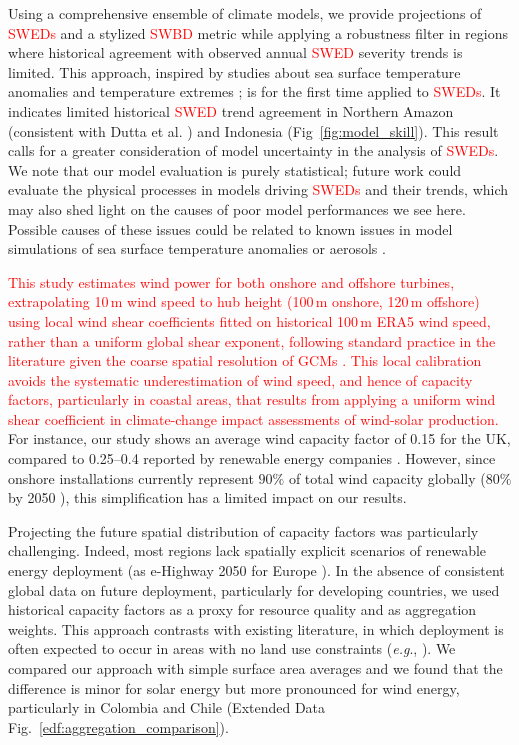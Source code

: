 \documentclass[pdflatex,sn-mathphys-num]{sn-jnl}%
\begin{document}
Using a comprehensive ensemble of climate models, we provide projections of \textcolor{red}{SWEDs} and a stylized \textcolor{red}{SWBD} metric while applying a robustness filter in regions where historical agreement with observed annual \textcolor{red}{SWED} severity trends is limited. This approach, inspired by studies about sea surface temperature anomalies \cite{ipcc2021physical} and temperature extremes \cite{kornhuberGlobalEmergenceRegional2024}; is for the first time applied to \textcolor{red}{SWEDs}. It indicates limited historical \textcolor{red}{SWED} trend agreement in Northern Amazon (consistent with Dutta et al. \cite{duttaFutureSolarEnergy2022}) and Indonesia (Fig~\ref{fig:model_skill}). This result calls for a greater consideration of model uncertainty in the analysis of \textcolor{red}{SWEDs}. We note that our model evaluation is purely statistical; future work could evaluate the physical processes in models driving \textcolor{red}{SWEDs} and their trends, which may also shed light on the causes of poor model performances we see here. Possible causes of these issues could be related to known issues in model simulations of sea surface temperature anomalies or aerosols \cite{schumacherExacerbatedSummerEuropean2024, bartokProjectedChangesSurface2017a}. 


\textcolor{red}{This study estimates wind power for both onshore and offshore turbines, extrapolating 10\,m wind speed to hub height (100\,m onshore, 120\,m offshore) using local wind shear coefficients fitted on historical 100\,m ERA5 wind speed, rather than a uniform global shear exponent, following standard practice in the literature given the coarse spatial resolution of GCMs \cite{quProlongedWindDroughts2025a}. This local calibration avoids the systematic underestimation of wind speed, and hence of capacity factors, particularly in coastal areas, that results from applying a uniform wind shear coefficient in climate-change impact assessments of wind-solar production.} For instance, our study shows an average wind capacity factor of 0.15 for the UK, compared to 0.25–0.4 reported by renewable energy companies \cite{DigestUKEnergy2025}. However, since onshore installations currently represent $90\%$ of total wind capacity globally ($80\%$ by 2050 \cite{IEA2024}), this simplification has a limited impact on our results.

Projecting the future spatial distribution of capacity factors was particularly challenging. Indeed, most regions lack spatially explicit scenarios of renewable energy deployment (as e-Highway 2050 for Europe \cite{sanchis2015}). In the absence of consistent global data on future deployment, particularly for developing countries, we used historical capacity factors as a proxy for resource quality and as aggregation weights. This approach contrasts with existing literature, in which deployment is often expected to occur in areas with no land use constraints (\textit{e.g}., \cite{wangRisingWorldwideChallenges2025, zhengStrategiesClimateresilientGlobal2025}). We compared our approach with simple surface area averages and we found that the difference is minor for solar energy but more pronounced for wind energy, particularly in Colombia and Chile (Extended Data Fig.~\ref{edf:aggregation_comparison}).  
\end{document}
